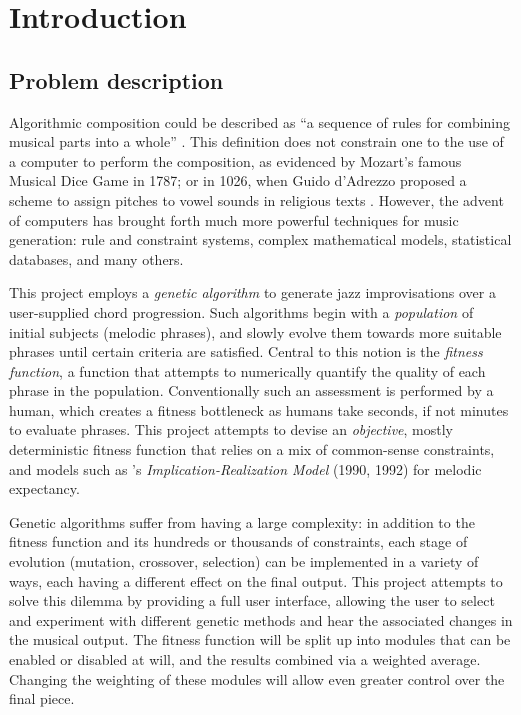 \chapter{Introduction}


\section{Problem description}

Algorithmic composition could be described as ``a sequence of rules for combining musical parts into a whole'' \citep{cope93}. This definition does not constrain one to the use of a computer to perform the
composition, as evidenced by Mozart's famous Musical Dice Game in 1787; or in 1026, when Guido d'Adrezzo
proposed a scheme to assign pitches to vowel sounds in religious texts \citep{loy89}. However, the advent of computers
has brought forth much more powerful techniques for music generation: rule and constraint systems, complex mathematical models, statistical databases, and many others.

This project employs a \emph{genetic algorithm} to generate jazz improvisations over a user-supplied
chord progression. Such algorithms begin with a \emph{population} of initial subjects (melodic phrases), and slowly
evolve them towards more suitable phrases until certain criteria are satisfied. Central to this notion is the
\emph{fitness function}, a function that attempts to numerically quantify the quality of each phrase in the
population. Conventionally such an assessment is performed by a human, which creates a fitness bottleneck \citep{biles94}
as humans take seconds, if not minutes to evaluate phrases. This project attempts to devise an \emph{objective},
mostly deterministic fitness function that relies on a mix of common-sense constraints, and models such as \citeauthor{narmour90}'s
\emph{Implication-Realization Model} (1990, 1992) for melodic expectancy.

Genetic algorithms suffer from having a large complexity: in addition to the fitness function and its hundreds or thousands of constraints, each stage of evolution (mutation, crossover, selection) can be implemented in a variety of ways, each having a different effect on the final output. This project attempts to solve this dilemma by providing a full user interface, allowing the user to select and experiment with different genetic methods and hear the associated changes in the musical output. The fitness function will be split up into modules that can be enabled or disabled at will, and the results combined via a weighted average. Changing the weighting of these modules will allow even greater control over the final piece.

